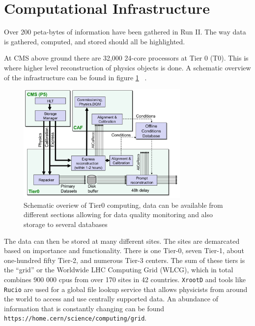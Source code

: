 \section{Computational Infrastructure}
Over 200 peta-bytes of information have been gathered in Run II. The way data is gathered, computed, and stored should all be highlighted. 

At CMS above ground there are 32,000 24-core processors at Tier 0 (T0). This is where higher level reconstruction of physics objects is done. A schematic overview of the infrastructure can be found in figure \ref{fig:t0} ~\cite{Hufnagel:1319049}. 

\begin{figure}[ht!b]
  \centering
\includegraphics[width=0.75\textwidth]{figures/Tier0.png}    
    \caption{\label{fig:t0} Schematic overiew of Tier0 computing, data can be available from different sections allowing for data quality monitoring and also storage to several databases ~\cite{Hufnagel:1319049} }
\end{figure}

The data can then be stored at many different sites. The sites are demarcated based on importance and functionality. There is one Tier-0, seven Tier-1, about one-hundred fifty Tier-2, and numerous Tier-3 centers. The sum of these tiers is the ``grid'' or the Worldwide LHC Computing Grid (WLCG), which in total combines 900 000 cpus from over 170 sites in 42 countries. \texttt{XrootD} and tools like \texttt{Rucio} are used for a global file lookup service that allows physicists from around the world to access and use centrally supported data. An abundance of information that is constantly changing can be found \texttt{https://home.cern/science/computing/grid}. 



